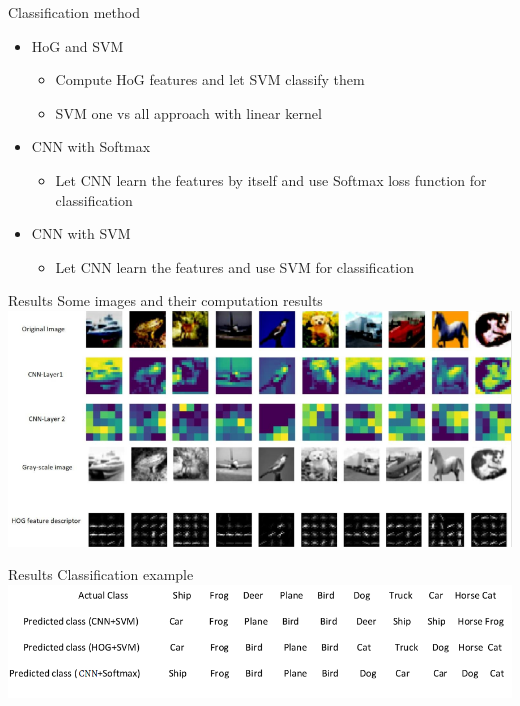 \documentclass[final]{beamer}
\newlength{\onecolwid}
\begin{document}
\begin{frame}
\begin{columns}
\begin{column}{\onecolwid}
\begin{block}{Classification method}
	\begin{itemize}
		\item HoG and SVM
		\begin{itemize}
			\item Compute HoG features and let SVM classify them
			\item SVM one vs all approach with linear kernel 
		\end{itemize}
		\item CNN with Softmax
		\begin{itemize}
			\item Let CNN learn the features by itself and use Softmax loss function for classification 
		\end{itemize}
		\item CNN with SVM
		\begin{itemize}
			\item Let CNN learn the features and use SVM for classification
		\end{itemize}
	\end{itemize}
\end{block}

\begin{block}{Results}
	Some images and their computation results
	\includegraphics[width=\linewidth]{imgs}
\end{block}

\begin{block}{Results}
	Classification example
	\includegraphics[width=\linewidth]{pics}
	

\end{block}
\end{column}
\end{columns}
\end{frame}
\end{document}
